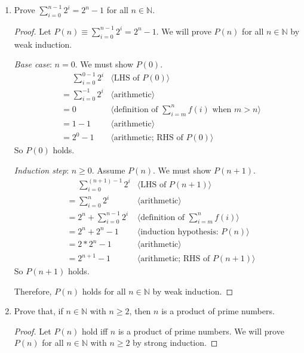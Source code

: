 \documentclass[11pt,fleqn]{article}
\newcommand{\pnote}[1]{{\langle \text{#1} \rangle}}
\begin{document}
\begin{enumerate}

  \item Prove $\sum^{n-1}_{i=0}2^i = 2^n - 1$ for all $n \in
    \mathbb{N}$.

\begin{proof}
Let $P(n) \equiv \sum^{n-1}_{i=0}2^i = 2^n - 1$.  We will prove $P(n)$
for all $n \in \mathbb{N}$ by weak induction.

\medskip

\emph{Base case}: $n = 0$.  We must show $P(0)$.
\begin{align*}
  &\phantom{{}=} \sum_{i=0}^{0-1} 2^{i} & \pnote{LHS of $P(0)$}\\
  &= \sum^{-1}_{i = 0} 2^i  & \pnote{arithmetic}\\
  &= 0          & \pnote{definition of $\textstyle{\sum}_{i=m}^{n} f(i)$ when $m > n$}\\
  &= 1 - 1      & \pnote{arithmetic}\\
  &= 2^0 - 1    & \pnote{arithmetic; RHS of $P(0)$}
\end{align*}
So $P(0)$ holds.

\medskip

\emph{Induction step}: $n \ge 0$. Assume $P(n)$. We must show $P(n + 1)$.
\begin{align*}
  &\phantom{{}=} \sum_{i=0}^{(n + 1) - 1} 2^i   & \pnote{LHS of $P(n + 1)$}\\
  &= \sum_{i=0}^{n} 2^{i}       & \pnote{arithmetic}\\
  &= 2^n + \sum_{i=0}^{n-1} 2^i & \pnote{definition of $\textstyle{\sum}_{i=m}^{n} f(i)$}\\
  &= 2^n + 2^n - 1             & \pnote{induction hypothesis: $P(n)$}\\
  &= 2*2^n - 1                 & \pnote{arithmetic}\\
  &= 2^{n+1} - 1               & \pnote{arithmetic; RHS of $P(n + 1)$}
\end{align*}
So $P(n + 1)$ holds.

\medskip

Therefore, $P(n)$ holds for all $n \in \mathbb{N}$ by weak induction.
\end{proof}

  \item Prove that, if $n \in \mathbb{N}$ with $n \ge 2$, then $n$ is
    a product of prime numbers.

\begin{proof}
Let $P(n)$ hold iff $n$ is a product of prime numbers.  We will prove
$P(n)$ for all $n \in \mathbb{N}$ with $n \ge 2$ by strong induction.


\end{proof}
\end{enumerate}
\end{document}
